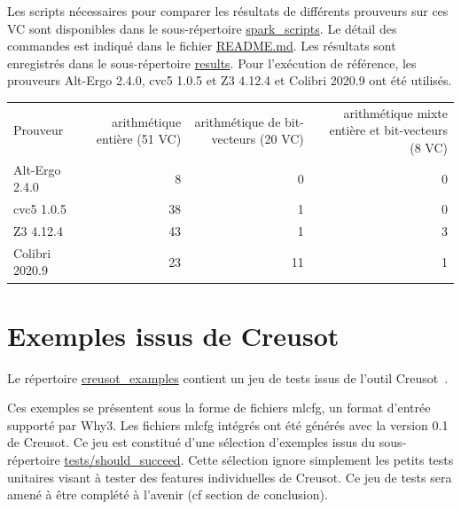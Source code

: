 \documentclass[a4paper,11pt]{article}
\begin{document}
Les scripts nécessaires pour comparer les résultats de différents prouveurs sur
ces VC sont disponibles dans le sous-répertoire \url{spark_scripts}. Le détail
des commandes est indiqué dans le fichier \url{README.md}. Les résultats sont
enregistrés dans le sous-répertoire \url{results}.  Pour l'exécution de
référence, les prouveurs Alt-Ergo 2.4.0, cvc5 1.0.5 et Z3 4.12.4 et Colibri
2020.9 ont été utilisés.

\begin{center}
  \begin{tabular}{|l|r|r|r|}
    \hline
  \rowcolor{gray!50} Prouveur
  & \multicolumn{1}{p{0.2\textwidth}|}{arithmétique entière (51 VC)}
  & \multicolumn{1}{p{0.2\textwidth}|}{arithmétique de bit-vecteurs (20 VC)}
  & \multicolumn{1}{p{0.2\textwidth}|}{arithmétique mixte entière et bit-vecteurs (8 VC)}
  \\
  Alt-Ergo 2.4.0                &  8 &  0 & 0  \\
  cvc5 1.0.5                    & 38 &  1 & 0 \\
  Z3 4.12.4                     & 43 &  1 & 3 \\
    Colibri 2020.9                & 23 & 11 & 1 \\
    \hline
\end{tabular}
\end{center}

\section{Exemples issus de Creusot}

Le répertoire \url{creusot_examples} contient un jeu de tests issus de
l'outil Creusot~\cite{denis22icfem}.

Ces exemples se présentent sous la forme de fichiers mlcfg, un format d'entrée supporté par Why3.
Les fichiers mlcfg intégrés ont été générés avec la version 0.1 de
Creusot.
Ce jeu est constitué d'une sélection d'exemples issus du
sous-répertoire \url{tests/should_succeed}. Cette sélection ignore
simplement les petits tests unitaires visant à tester des features
individuelles de Creusot.
Ce jeu de tests sera amené à être complété à l'avenir (cf section de conclusion).
\end{document}
